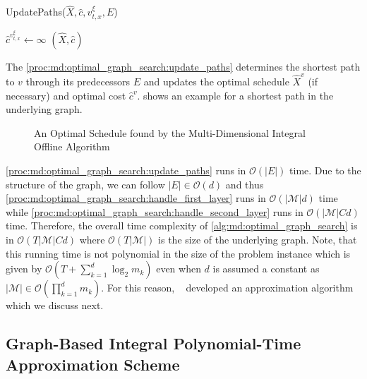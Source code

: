 \begin{function}
	\caption{UpdatePaths($\hat{X}, \hat{c}, v_{t,x}^{\xi}, E$)}\label{proc:md:optimal_graph_search:update_paths}
	$\hat{c}^{v_{t,x}^{\xi}} \gets \infty$\;
    \Return $(\hat{X}, \hat{c})$\;
\end{function}

The \cref{proc:md:optimal_graph_search:update_paths} determines the shortest path to $v$ through its predecessors $E$ and updates the optimal schedule $\hat{X}^v$ (if necessary) and optimal cost $\hat{c}^v$.  shows an example for a shortest path in the underlying graph.

\begin{figure}
    \centering
    [TODO]
    \caption{An Optimal Schedule found by the Multi-Dimensional Integral Offline Algorithm}
    \label{fig:an_optimal_schedule_found_by_the_multi_dimensional_integral_offline_algorithm}
\end{figure}

\ref{proc:md:optimal_graph_search:update_paths} runs in $\mathcal{O}(|E|)$ time. Due to the structure of the graph, we can follow $|E| \in \mathcal{O}(d)$ and thus \ref{proc:md:optimal_graph_search:handle_first_layer} runs in $\mathcal{O}(|\mathcal{M}| d)$ time while \ref{proc:md:optimal_graph_search:handle_second_layer} runs in $\mathcal{O}(|\mathcal{M}| C d)$ time. Therefore, the overall time complexity of \cref{alg:md:optimal_graph_search} is in $\mathcal{O}(T |\mathcal{M}| C d)$ where $\mathcal{O}(T |\mathcal{M}|)$ is the size of the underlying graph. Note, that this running time is not polynomial in the size of the problem instance which is given by $\mathcal{O}(T + \sum_{k=1}^d \log_2 m_k)$ even when $d$ is assumed a constant as $|\mathcal{M}| \in \mathcal{O}(\prod_{k=1}^d m_k)$. For this reason, \citeauthor*{Albers2021_2}~\cite{Albers2021_2} developed an approximation algorithm which we discuss next.

\subsection{Graph-Based Integral Polynomial-Time Approximation Scheme}


